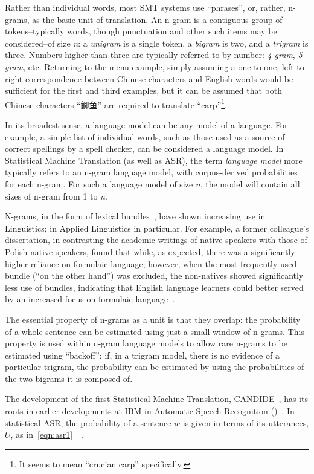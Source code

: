 Rather than individual words, most SMT systems use ``phrases'', or, rather, n-grams, as the basic unit
of translation. An n-gram is a contiguous group of tokens--typically words, though punctuation 
and other such items may be considered--of size \textit{n}: a \textit{unigram} is a single token,
a \textit{bigram} is two, and a \textit{trigram} is three. Numbers higher than three are typically
referred to by number: \textit{4-gram}, \textit{5-gram}, etc. Returning to the menu example, simply
assuming a one-to-one, left-to-right correspondence between Chinese characters and English words
would be sufficient for the first and third examples, but it can be assumed that both Chinese 
characters ``鲫鱼'' are required to translate ``carp''\footnote{It seems to mean ``crucian carp'' specifically.}.
 
In its broadest sense, a language model can be any model of a language.
For example, a simple list of individual words, such as those used as a source of correct spellings
by a spell checker, can be considered a language model. In Statistical Machine Translation (as well as ASR), the term
\textit{language model} more typically refers to an n-gram language model, with corpus-derived 
probabilities for each n-gram. For such a language model of size \textit{n}, the model will contain
all sizes of n-gram from 1 to \textit{n}.
 
N-grams, in the form of lexical bundles~\citep{biber2004bundlers}, have shown increasing use in Linguistics; in
Applied Linguistics in particular. For example, a former colleague's dissertation, in contrasting the academic
writings of native speakers with those of Polish native speakers, found that while, as expected, there was
a significantly higher reliance on formulaic language; however, when the most frequently used bundle (``on the other hand'')
was excluded, the non-natives showed significantly less use of bundles, indicating that English language learners
could better served by an increased focus on formulaic language~\citep{kozicka2016dissertation}.

The essential property of n-grams as a unit is that they overlap: the probability of a whole sentence can be
estimated using just a small window of n-grams. This property is used within n-gram language models to
allow rare n-grams to be estimated using ``backoff'': if, in a trigram model, there is no evidence of a
particular trigram, the probability can be estimated by using the probabilities of the two bigrams it is
composed of.


The development of the first Statistical Machine Translation, CANDIDE~\citep{berger1994candide}, 
has its roots in earlier developments at IBM in Automatic Speech Recognition ()~\citep{Jelinek2009dawn}.
In statistical ASR, the probability of a sentence $w$ is given in terms of its utterances, $U$, as 
in~\ref{eqn:asr1}~~\citep[p. 538, (3)]{jelinek1976asr}.

